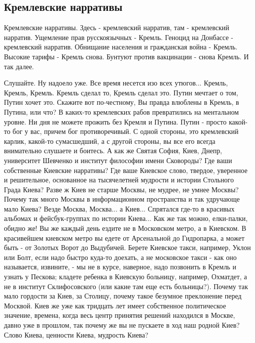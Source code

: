  
 
 
 
 

\subsection{Кремлевские нарративы}

Кремлевские нарративы. Здесь - кремлевский нарратив, там - кремлевский
нарратив. Ущемление прав русскоязычных - Кремль. Геноцид на Донбассе -
кремлевский нарратив. Обнищание населения и гражданская война - Кремль. Высокие
тарифы - Кремль снова. Бунтуют против вакцинации - снова Кремль. И так далее.

Слушайте. Ну надоело уже. Все время несется изо всех утюгов... Кремль, Кремль,
Кремль. Кремль сделал то, Кремль сделал это. Путин мечтает о том, Путин хочет
это. Скажите вот по-честному, Вы правда влюблены в Кремль, в Путина, или что? В
каких-то кремлевских рабов превратились на ментальном уровне. Ни дня не можете
прожить без Кремля и Путина. Путин - просто какой-то бог у вас, причем бог
противоречивый. С одной стороны, это кремлевский карлик, какой-то сумасшедший,
а с другой стороны, вы все его всегда внимательно слушаете и боитесь.  А как же
Святая София, Киев, Днепр, университет Шевченко и институт философии имени
Сковороды? Где ваши собственные Киевские нарративы? Где ваше Киевское слово,
твердое, уверенное и решительное, основанное на тысячелетней мудрости и истории
Стольного Града Киева? Разве ж Киев не старше Москвы, не мудрее, не умнее
Москвы?  Почему так много Москвы в информационном пространства и так удручающе
мало Киева? Везде Москва, Москва...  а Киев... Спрятался где-то в красивых
альбомах и фейсбук-группах по истории Киева... Как же так можно, елки-палки,
обидно же! Вы же каждый день ездите не в Московском метро, а в Киевском. В
красивейшем киевском метро вы едете от Арсенальной до Гидропарка, а может быть
- от Золотых Ворот до Выдубичей. Берете Киевское такси, например, Уклон или
Болт, если надо быстро куда-то доехать, а не московское такси - как оно
называется, извините, - мы не в курсе, наверное, надо позвонить в Кремль и
узнать у Пескова; кладете ребенка в Киевскую больницу, например, Охматдет, а не
в институт Склифосовского (или какие там еще есть больницы?). Почему так мало
гордости за Киев, за Столицу, почему такое безумное преклонение перед Москвой.
Киев же уже как тридцать лет имеет собственное политическое значение, времена,
когда весь центр принятия решений находился в Москве, давно уже в прошлом, так
почему же вы не пускаете в ход наш родной Киев? Слово Киева, ценности Киева,
мудрость Киева? 

